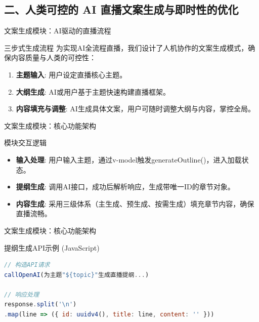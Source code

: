 \documentclass{beamer}
\begin{document}
\subsection{二、人类可控的 AI 直播文案生成与即时性的优化}
\begin{frame}{文案生成模块：AI驱动的直播流程}
    \begin{exampleblock}{三步式生成流程}
        为实现AI全流程直播，我们设计了人机协作的文案生成模式，确保内容质量与人类的可控性：
        \begin{enumerate}
            \item \textbf{主题输入}: 用户设定直播核心主题。
            \item \textbf{大纲生成}: AI或用户基于主题快速构建直播框架。
            \item \textbf{内容填充与调整}: AI生成具体文案，用户可随时调整大纲与内容，掌控全局。
        \end{enumerate}
    \end{exampleblock}
\end{frame}

\begin{frame}[fragile]{文案生成模块：核心功能架构}
    \begin{block}{模块交互逻辑}
        \begin{itemize}
            \item \textbf{输入处理}: 用户输入主题，通过v-model触发generateOutline()，进入加载状态。
            \item \textbf{提纲生成}: 调用AI接口，成功后解析响应，生成带唯一ID的章节对象。
            \item \textbf{内容生成}: 采用三级体系（主生成、预生成、按需生成）填充章节内容，确保直播流畅。
        \end{itemize}
    \end{block}
\end{frame}


\begin{frame}[fragile]{文案生成模块：核心功能架构}
    \begin{block}{提纲生成API示例 (JavaScript)}
        \begin{lstlisting}[language=JavaScript]
// 构造API请求
callOpenAI(为主题"${topic}"生成直播提纲...)

// 响应处理
response.split('\n')
.map(line => ({ id: uuidv4(), title: line, content: '' }))
\end{lstlisting}
    \end{block}
\end{frame}
\end{document}
